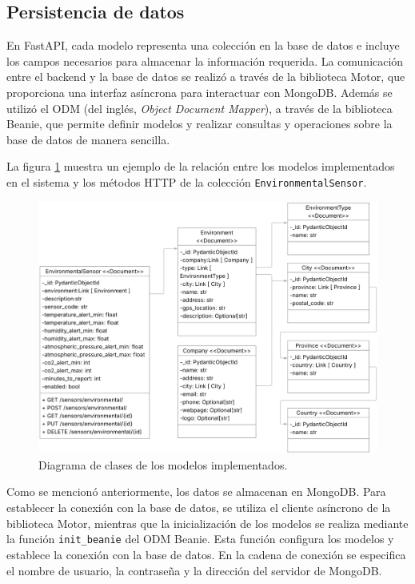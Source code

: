 \subsection{Persistencia de datos}

En FastAPI, cada modelo representa una colección en la base de datos e incluye
los campos necesarios para almacenar la información requerida. La comunicación
entre el backend y la base de datos se realizó a través de la biblioteca Motor,
que proporciona una interfaz asíncrona para interactuar con MongoDB. Además se
utilizó el ODM (del inglés, \textit{Object Document Mapper}), a través de la
biblioteca Beanie, que permite definir modelos y realizar consultas y
operaciones sobre la base de datos de manera sencilla.

La figura \ref{fig:diagrama de clases} muestra un ejemplo de la relación entre
los modelos implementados en el sistema y los métodos HTTP de la colección
\texttt{EnvironmentalSensor}.

\begin{figure}[H]
    \centering
    \includegraphics[width=.85\textwidth]{./Images/18.png}
    \caption{Diagrama de clases de los modelos implementados.}
    \label{fig:diagrama de clases}
\end{figure}

Como se mencionó anteriormente, los datos se almacenan en MongoDB. Para
establecer la conexión con la base de datos, se utiliza el cliente asíncrono de
la biblioteca Motor, mientras que la inicialización de los modelos se realiza
mediante la función \texttt{init\_beanie} del ODM Beanie. Esta función
configura los modelos y establece la conexión con la base de datos. En la
cadena de conexión se especifica el nombre de usuario, la contraseña y la
dirección del servidor de MongoDB.

